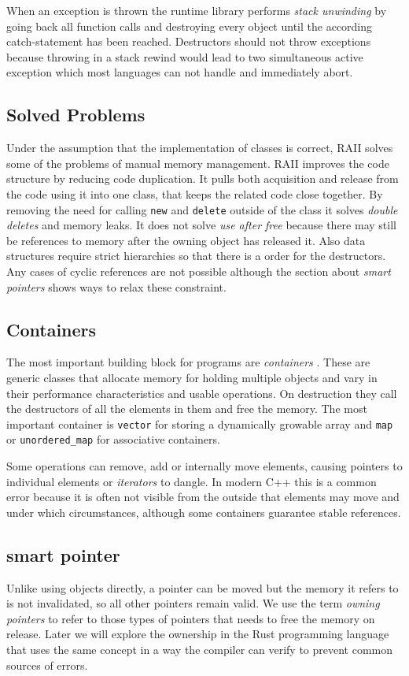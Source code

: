\documentclass[conference,twocolumn]{IEEEtran}
\begin{document}
When an exception is thrown the runtime library performs \emph{stack unwinding} by going back all function calls and destroying every object until the according catch-statement has been reached. Destructors should not throw exceptions because throwing in a stack rewind would lead to two simultaneous active exception which most languages can not handle and immediately abort. \cite{cpp14std}

\subsection{Solved Problems}
Under the assumption that the implementation of classes is correct, RAII solves some of the problems of manual memory management.
RAII improves the code structure by reducing code duplication. It pulls both acquisition and release from the code using it into one class, that keeps the related code close together. By removing the need for calling \verb|new| and \verb|delete| outside of the class it solves \emph{double deletes} and memory leaks. It does not solve \emph{use after free} because there may still be references to memory after the owning object has released it.
Also data structures require strict hierarchies so that there is a order for the destructors. Any cases of cyclic references are not possible although the section about \emph{smart pointers} shows ways to relax these constraint.


\subsection{Containers}
The most important building block for programs are \emph{containers} \cite{stroustrupFoundationsCpp}. These are generic classes that allocate memory for holding multiple objects and vary in their performance characteristics and usable operations. On destruction they call the destructors of all the elements in them and free the memory. The most important container is \verb|vector| for storing a dynamically growable array and \verb|map| or \verb|unordered_map| for associative containers.

Some operations can remove, add or internally move elements, causing pointers to individual elements or \emph{iterators} to dangle. In modern C++ this is a common error because it is often not visible from the outside that elements may move and under which circumstances, although some containers guarantee stable references.


\subsection{smart pointer}
Unlike using objects directly, a pointer can be moved but the memory it refers to is not invalidated, so all other pointers remain valid. We use the term \emph{owning pointers} to refer to those types of pointers that needs to free the memory on release. Later we will explore the ownership in the Rust programming language that uses the same concept in a way the compiler can verify to prevent common sources of errors.
\end{document}
